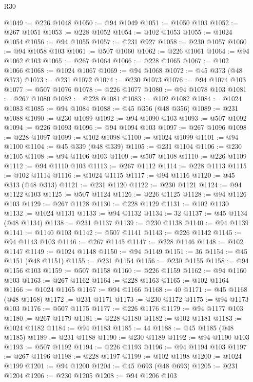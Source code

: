 \begin{lexlean}{R30}
\begin{coremodule}
@1049 := @226 @1048
@1050 := @94 @1049
@1051 := @1050 @103
@1052 := @267 @1051
@1053 := @228 @1052
@1054 := @102 @1053
@1055 := @1024 @1054
@1056 := @94 @1055
@1057 := @231 @927
@1058 := @230 @1057
@1060 := @94 @1058 @103
@1061 := @507 @1060
@1062 := @226 @1061
@1064 := @94 @1062 @103
@1065 := @267 @1064
@1066 := @228 @1065
@1067 := @102 @1066
@1068 := @1024 @1067
@1069 := @94 @1068
@1072 := @45 @373 (@48 @373)
@1073 := @231 @1072
@1074 := @230 @1073
@1076 := @94 @1074 @103
@1077 := @507 @1076
@1078 := @226 @1077
@1080 := @94 @1078 @103
@1081 := @267 @1080
@1082 := @228 @1081
@1083 := @102 @1082
@1084 := @1024 @1083
@1085 := @94 @1084
@1088 := @45 @356 (@48 @356)
@1089 := @231 @1088
@1090 := @230 @1089
@1092 := @94 @1090 @103
@1093 := @507 @1092
@1094 := @226 @1093
@1096 := @94 @1094 @103
@1097 := @267 @1096
@1098 := @228 @1097
@1099 := @102 @1098
@1100 := @1024 @1099
@1101 := @94 @1100
@1104 := @45 @339 (@48 @339)
@1105 := @231 @1104
@1106 := @230 @1105
@1108 := @94 @1106 @103
@1109 := @507 @1108
@1110 := @226 @1109
@1112 := @94 @1110 @103
@1113 := @267 @1112
@1114 := @228 @1113
@1115 := @102 @1114
@1116 := @1024 @1115
@1117 := @94 @1116
@1120 := @45 @313 (@48 @313)
@1121 := @231 @1120
@1122 := @230 @1121
@1124 := @94 @1122 @103
@1125 := @507 @1124
@1126 := @226 @1125
@1128 := @94 @1126 @103
@1129 := @267 @1128
@1130 := @228 @1129
@1131 := @102 @1130
@1132 := @1024 @1131
@1133 := @94 @1132
@1134 := 32
@1137 := @45 @1134 (@48 @1134)
@1138 := @231 @1137
@1139 := @230 @1138
@1140 := @94 @1139
@1141 := @1140 @103
@1142 := @507 @1141
@1143 := @226 @1142
@1145 := @94 @1143 @103
@1146 := @267 @1145
@1147 := @228 @1146
@1148 := @102 @1147
@1149 := @1024 @1148
@1150 := @94 @1149
@1151 := 36
@1154 := @45 @1151 (@48 @1151)
@1155 := @231 @1154
@1156 := @230 @1155
@1158 := @94 @1156 @103
@1159 := @507 @1158
@1160 := @226 @1159
@1162 := @94 @1160 @103
@1163 := @267 @1162
@1164 := @228 @1163
@1165 := @102 @1164
@1166 := @1024 @1165
@1167 := @94 @1166
@1168 := 40
@1171 := @45 @1168 (@48 @1168)
@1172 := @231 @1171
@1173 := @230 @1172
@1175 := @94 @1173 @103
@1176 := @507 @1175
@1177 := @226 @1176
@1179 := @94 @1177 @103
@1180 := @267 @1179
@1181 := @228 @1180
@1182 := @102 @1181
@1183 := @1024 @1182
@1184 := @94 @1183
@1185 := 44
@1188 := @45 @1185 (@48 @1185)
@1189 := @231 @1188
@1190 := @230 @1189
@1192 := @94 @1190 @103
@1193 := @507 @1192
@1194 := @226 @1193
@1196 := @94 @1194 @103
@1197 := @267 @1196
@1198 := @228 @1197
@1199 := @102 @1198
@1200 := @1024 @1199
@1201 := @94 @1200
@1204 := @45 @693 (@48 @693)
@1205 := @231 @1204
@1206 := @230 @1205
@1208 := @94 @1206 @103

\end{coremodule}
\end{lexlean}
